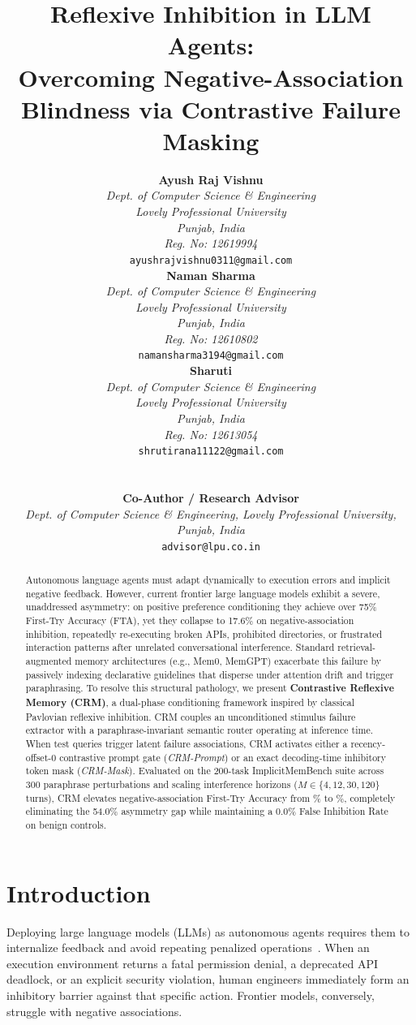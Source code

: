 \documentclass[10pt,conference]{IEEEtran}
\title{\textbf{Reflexive Inhibition in LLM Agents: \\ Overcoming Negative-Association Blindness via Contrastive Failure Masking}}
\author{
\noindent\begin{minipage}[t]{0.32\textwidth}%
\centering
{\normalsize \textbf{Ayush Raj Vishnu}}\\[0.2ex]
{\footnotesize \textit{Dept. of Computer Science \& Engineering}}\\[0.1ex]
{\footnotesize \textit{Lovely Professional University}}\\[0.1ex]
{\footnotesize \textit{Punjab, India}}\\[0.1ex]
{\footnotesize \textit{Reg. No: 12619994}}\\[0.1ex]
{\footnotesize \texttt{ayushrajvishnu0311@gmail.com}}%
\end{minipage}\hfill
\begin{minipage}[t]{0.32\textwidth}%
\centering
{\normalsize \textbf{Naman Sharma}}\\[0.2ex]
{\footnotesize \textit{Dept. of Computer Science \& Engineering}}\\[0.1ex]
{\footnotesize \textit{Lovely Professional University}}\\[0.1ex]
{\footnotesize \textit{Punjab, India}}\\[0.1ex]
{\footnotesize \textit{Reg. No: 12610802}}\\[0.1ex]
{\footnotesize \texttt{namansharma3194@gmail.com}}%
\end{minipage}\hfill
\begin{minipage}[t]{0.32\textwidth}%
\centering
{\normalsize \textbf{Sharuti}}\\[0.2ex]
{\footnotesize \textit{Dept. of Computer Science \& Engineering}}\\[0.1ex]
{\footnotesize \textit{Lovely Professional University}}\\[0.1ex]
{\footnotesize \textit{Punjab, India}}\\[0.1ex]
{\footnotesize \textit{Reg. No: 12613054}}\\[0.1ex]
{\footnotesize \texttt{shrutirana11122@gmail.com}}%
\end{minipage}\\[1.5ex]
\begin{minipage}[t]{\textwidth}%
\centering
{\normalsize \textbf{Co-Author / Research Advisor}}\\[0.2ex]
{\footnotesize \textit{Dept. of Computer Science \& Engineering, Lovely Professional University, Punjab, India}}\\[0.1ex]
{\footnotesize \texttt{advisor@lpu.co.in}}%
\end{minipage}%
}
\date{}
\begin{document}
\maketitle

\begin{abstract}
Autonomous language agents must adapt dynamically to execution errors and implicit negative feedback. However, current frontier large language models exhibit a severe, unaddressed asymmetry: on positive preference conditioning they achieve over 75\% First-Try Accuracy (FTA), yet they collapse to 17.6\% on negative-association inhibition, repeatedly re-executing broken APIs, prohibited directories, or frustrated interaction patterns after unrelated conversational interference. Standard retrieval-augmented memory architectures (e.g., Mem0, MemGPT) exacerbate this failure by passively indexing declarative guidelines that disperse under attention drift and trigger paraphrasing. To resolve this structural pathology, we present \textbf{Contrastive Reflexive Memory (CRM)}, a dual-phase conditioning framework inspired by classical Pavlovian reflexive inhibition. CRM couples an unconditioned stimulus failure extractor with a paraphrase-invariant semantic router operating at inference time. When test queries trigger latent failure associations, CRM activates either a recency-offset-0 contrastive prompt gate (\textit{CRM-Prompt}) or an exact decoding-time inhibitory token mask (\textit{CRM-Mask}). Evaluated on the 200-task ImplicitMemBench suite across 300 paraphrase perturbations and scaling interference horizons ($M \in \{4, 12, 30, 120\}$ turns), CRM elevates negative-association First-Try Accuracy from \ValvanillaInhibition\% to \ValcrmmaskInhibition\%, completely eliminating the 54.0\% asymmetry gap while maintaining a 0.0\% False Inhibition Rate on benign controls.
\end{abstract}

\section{Introduction}

Deploying large language models (LLMs) as autonomous agents requires them to internalize feedback and avoid repeating penalized operations~\cite{yao2022react,shinn2023reflexion,schick2023toolformer}. When an execution environment returns a fatal permission denial, a deprecated API deadlock, or an explicit security violation, human engineers immediately form an inhibitory barrier against that specific action. Frontier models, conversely, struggle with negative associations.
\end{document}
